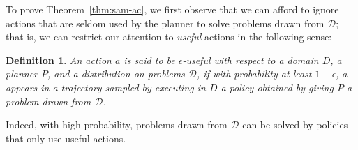 \documentclass[letterpaper]{article} %
\newtheorem{definition}{Definition}
\begin{document}

To prove Theorem~\ref{thm:sam-ac}, we first observe that we can afford to ignore actions that are seldom used by the planner to solve problems drawn from $\mathcal{D}$; that is, we can restrict our attention to \emph{useful} actions in the following sense:

\begin{definition}
An action $a$ is said to be \emph{$\epsilon$-useful} with respect to a domain $D$, a planner $P$, and a distribution on problems $\mathcal{D}$, if with probability at least $1-\epsilon$, $a$ appears in a trajectory sampled by executing in $D$ a policy obtained by giving $P$ a problem drawn from $\mathcal{D}$. \end{definition}
\noindent
Indeed, with high probability, problems drawn from $\mathcal{D}$ can be solved by policies that only use useful actions.
\end{document}
